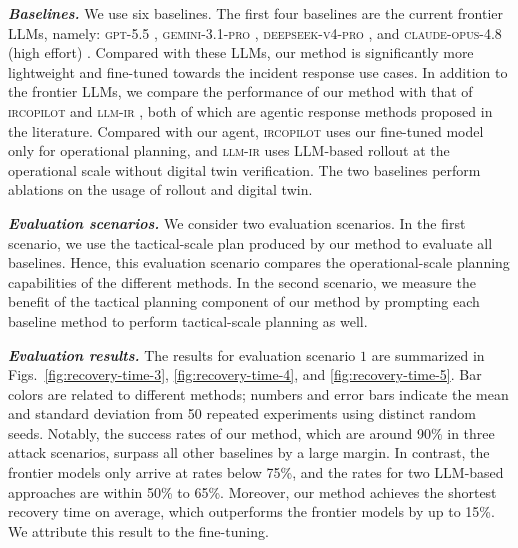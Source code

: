 \documentclass[runningheads,10pt]{llncs}
\begin{document}
\noindent\textit{\textbf{Baselines.}} We use six baselines. The first four baselines are the current frontier LLMs, namely: \textsc{gpt-5.5} \cite{gpt5-5}, \textsc{gemini-3.1-pro} \cite{gemini3-1}, \textsc{deepseek-v4-pro} \cite{ds-v4}, and \textsc{claude-opus-4.8} (high effort) \cite{opus4-8}. Compared with these LLMs, our method is significantly more lightweight and fine-tuned towards the incident response use cases. In addition to the frontier LLMs, we compare the performance of our method with that of \textsc{ircopilot} \cite{guo25ircopilot} and \textsc{llm-ir} \cite{kim26ndss}, both of which are agentic response methods proposed in the literature. Compared with our agent, \textsc{ircopilot} uses our fine-tuned model only for operational planning, and \textsc{llm-ir} uses LLM-based rollout at the operational scale without digital twin verification. The two baselines perform ablations on the usage of rollout and digital twin.

\noindent\textit{\textbf{Evaluation scenarios.}} We consider two evaluation scenarios. In the first scenario, we use the tactical-scale plan produced by our method to evaluate all baselines. Hence, this evaluation scenario compares the operational-scale planning capabilities of the different methods. In the second scenario, we measure the benefit of the tactical planning component of our method by prompting each baseline method to perform tactical-scale planning as well. 

\noindent\textit{\textbf{Evaluation results.}} The results for evaluation scenario $1$ are summarized in Figs.~\ref{fig:recovery-time-3}, \ref{fig:recovery-time-4}, and \ref{fig:recovery-time-5}. Bar colors are related to different methods; numbers and error bars indicate the mean and standard deviation from 50 repeated experiments using distinct random seeds. Notably, the success rates of our method, which are around 90\% in three attack scenarios, surpass all other baselines by a large margin. In contrast, the frontier models only arrive at rates below 75\%, and the rates for two LLM-based approaches are within 50\% to 65\%. Moreover, our method achieves the shortest recovery time on average, which outperforms the frontier models by up to 15\%. We attribute this result to the fine-tuning.
\end{document}
